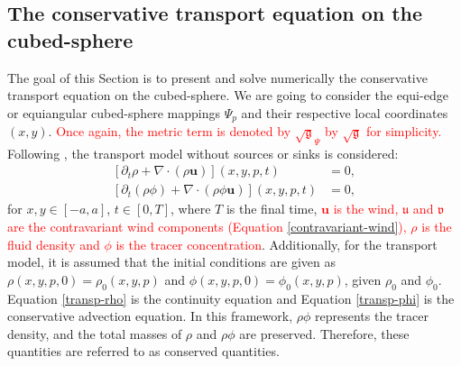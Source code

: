 \documentclass[preprint,12pt]{elsarticle}
\begin{document}
\begin{linenumbers}

\section{The conservative transport equation on the cubed-sphere}
\label{adv-2d}
The goal of this Section is to present and solve numerically the conservative transport equation on the cubed-sphere. 
We are going to consider the equi-edge or equiangular cubed-sphere mappings $\Psi_p$ and their respective local coordinates $(x,y)$.
\textcolor{red}{Once again, the metric term is denoted by $\sqrt{\mathfrak{g}}_{\Psi}$ by $\sqrt{\mathfrak{g}}$ for simplicity.}
Following \cite{nair:2010}, the transport model without sources or sinks is considered:
\begin{align}
	\label{transp-rho}
	[\partial_t \rho + \nabla \cdot (\rho \boldsymbol{u})](x,y,p,t)&=0,\\
	\label{transp-phi}
	[\partial_t (\rho \phi) + \nabla \cdot (\rho \phi \boldsymbol{u})](x,y,p,t)&=0,
\end{align}
for $x,y\in[-a,a]$, $t \in [0,T]$, where $T$ is the final time,
\textcolor{red}
{$\boldsymbol{u}$ is the wind, $\mathfrak{u}$ and $\mathfrak{v}$ are the contravariant wind components (Equation \ref{contravariant-wind}),
$\rho$ is the fluid density and $\phi$ is the tracer concentration}.
Additionally, for the transport model, it is assumed that the initial conditions are given as $\rho(x,y,p,0)=\rho_0(x,y,p)$ and $\phi(x,y,p,0)=\phi_0(x,y,p)$, given $\rho_0$ and $\phi_0$. %
Equation \eqref{transp-rho} is the continuity equation and Equation \eqref{transp-phi} is the conservative advection equation.
In this framework, $\rho \phi$ represents the tracer density, and the total masses of $\rho$ and $\rho \phi$ are preserved.  Therefore, these quantities are referred to as conserved quantities.


\end{linenumbers}
\end{document}
